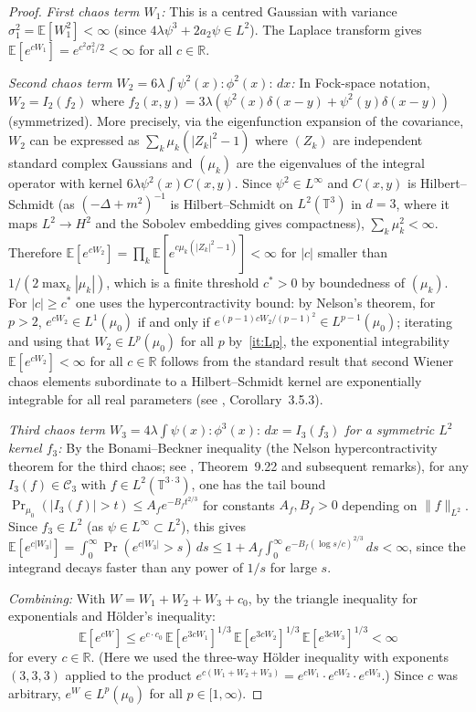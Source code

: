 \documentclass[12pt]{article}
\theoremstyle{definition}
\begin{document}
\begin{proof}
\emph{First chaos term $W_1$:} This is a centred Gaussian with variance
$\sigma_1^2 = \mathbb{E}[W_1^2] < \infty$ (since $4\lambda\psi^3 + 2a_2\psi \in L^2$). The
Laplace transform gives $\mathbb{E}[e^{cW_1}] = e^{c^2\sigma_1^2/2} < \infty$ for all $c \in \mathbb{R}$.

\emph{Second chaos term $W_2 = 6\lambda\int\psi^2(x):\phi^2(x):\,dx$:} In Fock-space notation,
$W_2 = I_2(f_2)$ where $f_2(x,y) = 3\lambda(\psi^2(x)\delta(x-y) + \psi^2(y)\delta(x-y))$
(symmetrized). More precisely, via the eigenfunction expansion of the covariance, $W_2$ can be
expressed as $\sum_k \mu_k(|Z_k|^2 - 1)$ where $(Z_k)$ are independent standard complex Gaussians
and $(\mu_k)$ are the eigenvalues of the integral operator with kernel $6\lambda\psi^2(x)C(x,y)$.
Since $\psi^2 \in L^\infty$ and $C(x,y)$ is Hilbert--Schmidt (as $(-\Delta+m^2)^{-1}$ is
Hilbert--Schmidt on $L^2(\mathbb{T}^3)$ in $d=3$, where it maps $L^2 \to H^2$ and the Sobolev
embedding gives compactness), $\sum_k \mu_k^2 < \infty$. Therefore
$\mathbb{E}[e^{cW_2}] = \prod_k \mathbb{E}[e^{c\mu_k(|Z_k|^2-1)}] < \infty$ for $|c|$ smaller
than $1/(2\max_k |\mu_k|)$, which is a finite threshold $c^* > 0$ by boundedness of $(\mu_k)$.
For $|c| \geq c^*$ one uses the hypercontractivity bound: by Nelson's theorem, for $p > 2$,
$e^{cW_2} \in L^1(\mu_0)$ if and only if $e^{(p-1)cW_2/(p-1)^2} \in L^{p-1}(\mu_0)$; iterating
and using that $W_2 \in L^p(\mu_0)$ for all $p$ by~\eqref{it:Lp}, the exponential integrability
$\mathbb{E}[e^{cW_2}] < \infty$ for all $c \in \mathbb{R}$ follows from the standard result that
second Wiener chaos elements subordinate to a Hilbert--Schmidt kernel are exponentially integrable
for all real parameters (see \cite{bogachev}, Corollary~3.5.3).

\emph{Third chaos term $W_3 = 4\lambda\int\psi(x):\phi^3(x):\,dx = I_3(f_3)$ for a symmetric
$L^2$ kernel $f_3$:} By the Bonami--Beckner inequality (the Nelson hypercontractivity theorem
for the third chaos; see \cite{janson}, Theorem~9.22 and subsequent remarks), for any $I_3(f) \in
\mathcal{C}_3$ with $f \in L^2(\mathbb{T}^{3 \cdot 3})$, one has the tail bound
$\Pr_{\mu_0}(|I_3(f)| > t) \leq A_f e^{-B_f t^{2/3}}$ for constants $A_f, B_f > 0$ depending on
$\|f\|_{L^2}$. Since $f_3 \in L^2$ (as $\psi \in L^\infty \subset L^2$), this gives
$\mathbb{E}[e^{c|W_3|}] = \int_0^\infty \Pr(e^{c|W_3|} > s)\,ds \leq 1 + A_f \int_0^\infty
e^{-B_f (\log s / c)^{2/3}}\,ds < \infty$, since the integrand decays faster than any power of
$1/s$ for large $s$.

\emph{Combining:} With $W = W_1 + W_2 + W_3 + c_0$, by the triangle inequality for exponentials
and H\"{o}lder's inequality:
\[
  \mathbb{E}[e^{cW}]
  \leq e^{c\cdot c_0}\,\mathbb{E}[e^{3cW_1}]^{1/3}\,\mathbb{E}[e^{3cW_2}]^{1/3}\,
       \mathbb{E}[e^{3cW_3}]^{1/3} < \infty
\]
for every $c \in \mathbb{R}$. (Here we used the three-way H\"{o}lder inequality with exponents
$(3,3,3)$ applied to the product $e^{c(W_1+W_2+W_3)} = e^{cW_1}\cdot e^{cW_2}\cdot e^{cW_3}$.)
Since $c$ was arbitrary, $e^{W} \in L^p(\mu_0)$ for all $p \in [1,\infty)$.
\end{proof}
\end{document}
